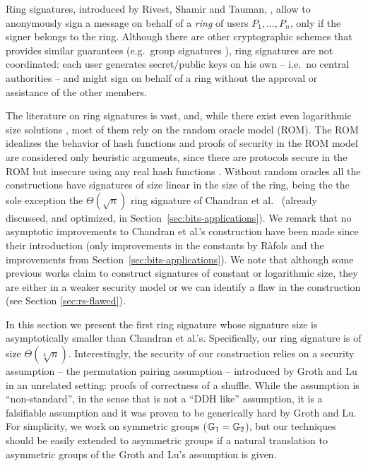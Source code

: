 Ring signatures, introduced by Rivest, Shamir and Tauman, \cite{AC:RivShaTau01}, allow to anonymously sign a message on behalf of a \emph{ring} of users $P_1,\ldots,P_n$, only if the signer belongs to the ring. Although there are other cryptographic schemes that provides similar guarantees (e.g.~group signatures \cite{EC:ChaVan91}), ring signatures are not coordinated: each user generates secret/public keys on his own -- i.e.~no central authorities -- and might sign on behalf of a ring without the approval or assistance of the other members.


The literature on ring signatures is vast, and, while there exist even logarithmic size solutions \cite{EC:GroKoh15,EC:LLNW16}, most of them rely on the {random oracle model} (ROM). The ROM idealizes the behavior of hash functions and proofs of security in the ROM model are considered only heuristic arguments, since there are protocols secure in the ROM but insecure using any real hash functions \cite{STOC:CanGolHal98}. Without random oracles all the constructions have signatures of size linear in the size of the ring, being the the sole exception the $\Theta(\sqrt{n})$ ring signature of Chandran et al.~\cite{ICALP:ChaGroSah07} (already discussed, and optimized, in Section~\ref{sec:bits-applications}). 
We remark that no asymptotic improvements to Chandran et al.'s construction have been made since their introduction (only improvements in the constants by R\`afols \cite{TCC:Rafols15} and the improvements from Section~\ref{sec:bits-applications}). We note that although some previous works claim to construct signatures of constant \cite{ACISP:BosDasRan15} or logarithmic \cite{IET:GriSusPla16} size, they are either in a weaker security model or we can identify a flaw in the construction (see Section \ref{sec:rs-flawed}). 


In this section we present the first ring signature whose signature size is asymptotically smaller than Chandran et al.'s. Specifically, our ring signature is of size $\Theta(\sqrt[3]{n})$. Interestingly, the security of our construction relies on a security assumption -- the {permutation pairing assumption} -- introduced by Groth and Lu \cite{AC:GroLu07} in an unrelated setting: proofs of correctness of a shuffle. While the assumption is ``non-standard'', in the sense that is not a ``DDH like'' assumption, it is a falsifiable assumption and it was proven to be generically hard by Groth and Lu. For simplicity, we work on symmetric groups ($\mathbb{G}_1=\mathbb{G}_2$), but our techniques should be easily extended to asymmetric groups if a natural translation to asymmetric groups of the Groth and Lu's assumption is given.

